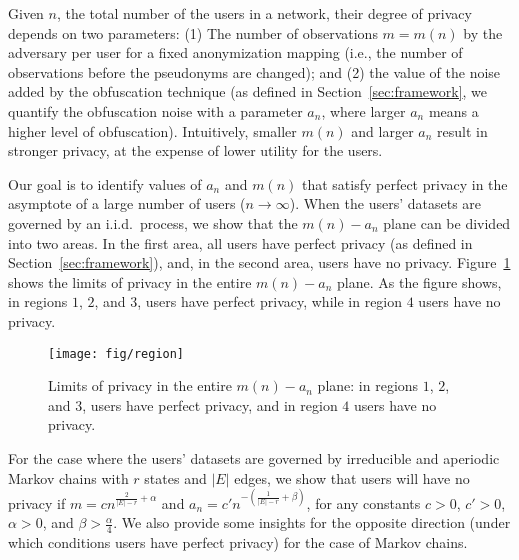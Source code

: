 Given $n$, the total number of the users in a network, their degree of privacy depends
on two parameters: (1) The number of observations $m=m(n)$ by the adversary per user for a fixed anonymization mapping (i.e., the number of observations before the pseudonyms are changed);  and (2) the value of the noise added by the obfuscation technique (as defined in Section~\ref{sec:framework}, we quantify the obfuscation noise with a parameter $a_n$, where larger $a_n$ means a higher level of obfuscation).  Intuitively, smaller $m(n)$ and larger $a_n$ result in stronger privacy, at the expense of lower utility for the users.

Our goal is to identify values of $a_n$ and $m(n)$ that satisfy perfect privacy in the asymptote of a large number of users ($n \rightarrow \infty$).
%
When the users' datasets are governed by an i.i.d.\ process, we show that
the $m(n)- a_n$ plane can be divided into two areas.  In the first area, all users have perfect privacy (as defined in Section~\ref{sec:framework}), and, in the second area, users have no privacy.
Figure~\ref{fig:region} shows the limits of privacy in the entire $m(n)- a_n$ plane.
As the figure shows, in regions $1$, $2$, and $3$, users have perfect privacy, while in region $4$ users have no privacy.
\begin{figure}[h]
	\centering
	\texttt{[image: fig/region]}
	\caption{Limits of privacy in the entire $m(n)-a_n$ plane: in regions $1$, $2$, and $3$, users have perfect privacy, and in region $4$ users have no privacy.}
	\label{fig:region}
\end{figure}

For the case where the users' datasets are governed by irreducible and aperiodic Markov chains with $r$ states and $|E|$ edges, we show that users will have no privacy if $m =cn^{\frac{2}{|E|-r} +  \alpha}$ and $a_n =c'n^{-\left(\frac{1}{|E|-r}+\beta \right)}$, for any constants $c>0$, $c'>0$, $\alpha>0$, and $\beta>\frac{\alpha}{4}$. We also provide some insights for the opposite direction (under which conditions users have perfect privacy) for the case of Markov chains.











